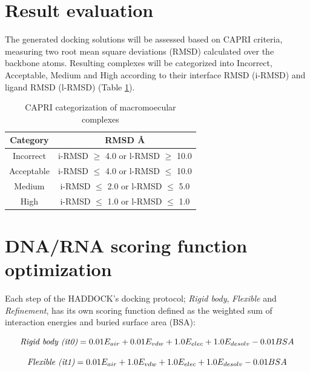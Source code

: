 \documentclass[
	12pt,				%
	openright,			%
	twoside,			%
	a4paper,			%
	english,			%
	french,				%
	spanish,			%
	brazil,				%
	]{abntex2}
\begin{document}
\section{Result evaluation}

The generated docking solutions will be assessed based on CAPRI \cite{Janin2002} criteria, measuring two root mean square deviations (RMSD) calculated over the backbone atoms. Resulting complexes will be categorized into Incorrect, Acceptable, Medium and High according to their interface RMSD (i-RMSD) and ligand RMSD (l-RMSD) (Table \ref{table:capri-table}). 

% 
\begin{table}[h]
	\centering
	\caption{CAPRI categorization of macromoecular complexes}
	\label{table:capri-table}
	\begin{tabular}{|c|c|}
		\hline
		\rowcolor[HTML]{C0C0C0} 
		Category   & RMSD \AA                          \\ \hline
		Incorrect  & i-RMSD $\geq$ 4.0 or l-RMSD $\geq$ 10.0 \\ \hline
		Acceptable & i-RMSD $\leq$ 4.0 or l-RMSD $\leq$ 10.0 \\ \hline
		Medium     & i-RMSD $\leq$ 2.0 or l-RMSD $\leq$ 5.0  \\ \hline
		High       & i-RMSD $\leq$ 1.0 or l-RMSD $\leq$ 1.0  \\ \hline
	\end{tabular}
\end{table}

\section{DNA/RNA scoring function optimization}

Each step of the HADDOCK’s docking protocol; \textit{Rigid body}, \textit{Flexible} and \textit{Refinement}, has its own scoring function defined as the weighted sum of interaction energies and buried surface area (BSA):

\begin{equation}
\emph{Rigid body (it0)} = 0.01 E_{air} + 0.01 E_{vdw} + 1.0 E_{elec} + 1.0 E_{desolv} - 0.01 BSA
\label{eq:05}
\end{equation}

\begin{equation}
\emph{Flexible (it1)} = 0.01 E_{air} + 1.0 E_{vdw} + 1.0 E_{elec} + 1.0 E_{desolv} - 0.01 BSA
\label{eq:06}
\end{equation}
\end{document}
